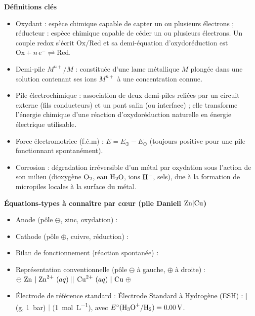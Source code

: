 \documentclass[11pt]{article}
\newcommand{\cle}[1]{{\popxbold\color{popdark}#1}}
\newcounter{popsec}
\newcounter{popsub}
\newcommand{\courssub}[1]{%
  \stepcounter{popsub}%
  \par\vspace{9pt}\noindent{\popxbold\fontsize{11.5}{13}\selectfont\color{popink}{\color{poporange}\thepopsec.\thepopsub}\hspace{6pt}#1}\par\nopagebreak\vspace{4pt}
}
\begin{document}
\courssub{L'essentiel à retenir}

\begin{aretenir}
\textbf{Définitions clés}
\begin{itemize}
  \item \cle{Oxydant} : espèce chimique capable de capter un ou plusieurs électrons ; \cle{réducteur} : espèce chimique capable de céder un ou plusieurs électrons. Un \cle{couple redox} s'écrit $\text{Ox}/\text{Red}$ et sa demi-équation d'oxydoréduction est $\text{Ox} + n\,e^- \rightleftharpoons \text{Red}$.
  \item \cle{Demi-pile $M^{n+}/M$} : constituée d'une lame métallique $M$ plongée dans une solution contenant ses ions $M^{n+}$ à une concentration connue.
  \item \cle{Pile électrochimique} : association de deux demi-piles reliées par un circuit externe (fils conducteurs) et un \cle{pont salin} (ou interface) ; elle transforme l'énergie chimique d'une réaction d'oxydoréduction naturelle en énergie électrique utilisable.
  \item \cle{Force électromotrice (f.é.m)} : $E = E_{\oplus} - E_{\ominus}$ (toujours positive pour une pile fonctionnant spontanément).
  \item \cle{Corrosion} : dégradation irréversible d'un métal par oxydation sous l'action de son milieu (dioxygène $\ce{O2}$, eau $\ce{H2O}$, ions $\ce{H+}$, sels), due à la formation de \cle{micropiles} locales à la surface du métal.
\end{itemize}

\textbf{Équations-types à connaître par cœur (pile Daniell $\ce{Zn}|\ce{Cu}$)}
\begin{itemize}
  \item Anode (pôle $\ominus$, zinc, oxydation) : 
  \item Cathode (pôle $\oplus$, cuivre, réduction) : 
  \item Bilan de fonctionnement (réaction spontanée) : 
  \item Représentation conventionnelle (pôle $\ominus$ à gauche, $\oplus$ à droite) : 
  $\ominus\ \ce{Zn}\ |\ \ce{Zn^2+}\ (aq)\ ||\ \ce{Cu^2+}\ (aq)\ |\ \ce{Cu}\ \oplus$
  \item Électrode de référence standard : \cle{Électrode Standard à Hydrogène (ESH)} : 
   $|$  (g, \SI{1}{bar}) $|$  (\SI{1}{mol.L^{-1}}), avec $E^\circ(\ce{H3O+}/\ce{H2}) = \SI{0,00}{V}$.
\end{itemize}


\end{aretenir}
\end{document}
